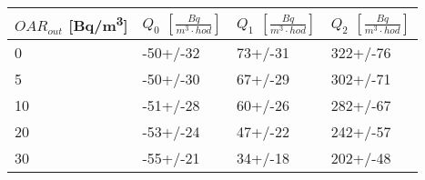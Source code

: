 \begin{tabular}{llll}
\toprule
$OAR_{out}$ [\si{Bq/m^3}] & $Q_0$ $\left[\si{\frac{Bq}{m^3\cdot hod}}\right]$ & $Q_1$ $\left[\si{\frac{Bq}{m^3\cdot hod}}\right]$ & $Q_2$ $\left[\si{\frac{Bq}{m^3\cdot hod}}\right]$ \\
\midrule
0  &  -50+/-32 &  73+/-31 &   322+/-76 \\
5  &  -50+/-30 &  67+/-29 &   302+/-71 \\
10 &  -51+/-28 &  60+/-26 &   282+/-67 \\
20 &  -53+/-24 &  47+/-22 &   242+/-57 \\
30 &  -55+/-21 &  34+/-18 &   202+/-48 \\
\bottomrule
\end{tabular}

